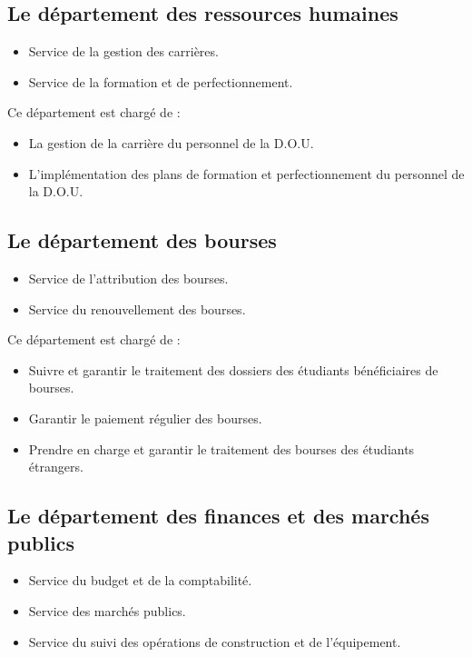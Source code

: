     \subsection{Le département des ressources humaines}
        \begin{itemize}
            \item Service de la gestion des carrières.
            \item Service de la formation et de perfectionnement.\\
        \end{itemize}

        Ce département est chargé de :
        \begin{itemize}\renewcommand{\labelitemi}{$\bullet$}
            \item La gestion de la carrière du personnel de la \acs{D.O.U}.
            \item L'implémentation des plans de formation et perfectionnement du personnel de la \acs{D.O.U}.
        \end{itemize}

    \subsection{Le département des bourses}
        \begin{itemize}
            \item Service de l'attribution des bourses.
            \item Service du renouvellement des bourses.\\
        \end{itemize}
        
        Ce département est chargé de :
        \begin{itemize}\renewcommand{\labelitemi}{$\bullet$}
            \item Suivre et garantir le traitement des dossiers des étudiants bénéficiaires de bourses.
            \item Garantir le paiement régulier des bourses.
            \item Prendre en charge et garantir le traitement des bourses des étudiants étrangers.
        \end{itemize}

    \subsection{Le département des finances et des marchés publics}
        \begin{itemize}
            \item Service du budget et de la comptabilité.
            \item Service des marchés publics.
            \item Service du suivi des opérations de construction et de l'équipement.\\
        \end{itemize}

